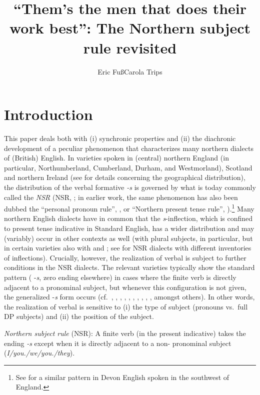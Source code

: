 \documentclass[output=paper]{langsci/langscibook}
\author{Eric Fuß\affiliation{Ruhr University Bochum}\lastand Carola Trips\affiliation{University of Mannheim}}
\title{“Them’s the men that does their work best”: The Northern subject rule revisited}
\begin{document}
\glsresetall

\section{Introduction}\label{sec:intro}

This paper deals both with (i) synchronic properties and (ii) the diachronic
development of a peculiar  phenomenon that characterizes many northern
dialects of (British) English. In varieties spoken in (central) northern
England (in particular, Northumberland, Cumberland, Durham, and Westmorland),
Scotland and northern Ireland (see \citealt{Pietsch:2005a,Pietsch:2005b} for
details concerning the geographical distribution), the distribution of the
verbal  formative \emph{-s} is governed by what is today commonly
called the \emph{\glsdesc{NSR}} (\gls{NSR},
\citealt[221]{Ihalainen:1994}; in earlier work, the same phenomenon has also
been dubbed the ``personal pronoun rule'', \citealt{McIntosh:1988}, or ``Northern
present tense rule'', \citealt{Montgomery:1994}).\footnote{See
\cite{GodfreyTagliamonte:1999} for a similar pattern in Devon English spoken in
the southwest of England.} Many northern English dialects have in common that
the \emph{s}-inflection, which is confined to \Tsg{} present tense indicative in
Standard English, has a wider distribution and may (variably) occur in other
contexts as well (with plural subjects, in particular, but in certain varieties
also with \Fsg{} and \Ssg{}; see \citealt{Pietsch:2005a,Pietsch:2005b} for \gls{NSR}
dialects with different inventories of inflections). Crucially, however, the
realization of verbal  is subject to further conditions in the \gls{NSR}
dialects. The relevant varieties typically show the standard  pattern
(\Tsg{} -\emph{s}, zero ending elsewhere) in cases where the finite verb is
directly adjacent to a pronominal subject, but whenever this configuration is
not given, the generalized -\emph{s} form occurs (cf.\ \citealt{Murray:1873},
\citealt{Berndt1956}, \citealt{McIntosh:1988}, \citealt{Montgomery:1994},
\citealt{Schendl:1996b}, \citealt{Corrigan:1997},
\citealt{Boerjarschapman:1998}, \citealt{Klemola:2000},
\citealt{Pietsch:2005a,Pietsch:2005b}, \citealt{deHaas:2011}, amongst others).
In other words, the realization of verbal  is sensitive to (i) the
type of subject (pronouns vs.\ full DP subjects) and (ii) the position of the
subject.\largerpage[-2]

\ea \textit{Northern subject rule} (\gls{NSR}): A finite verb
  (in the present indicative) takes the ending \emph{-s} except when it is
  directly adjacent to a non-\Tsg{} pronominal subject
  (\emph{I/you.\Sg/we/you.\Pl/they}).\label{ex:10:NSR}
\z
\end{document}
